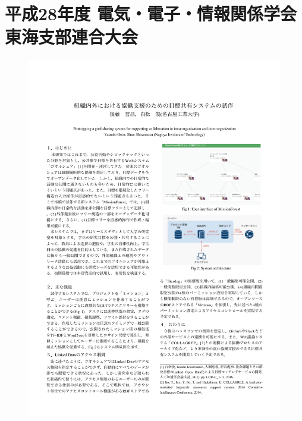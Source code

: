 \cleardoublepage
\chapter{平成28年度 電気・電子・情報関係学会 東海支部連合大会}
\begin{figure}[ht]
    \begin{center}
        \includegraphics[width=1.0\linewidth]{assets/pdf/tokai2016_1.pdf}
    \end{center}
\end{figure}
\clearpage

\cleardoublepage
